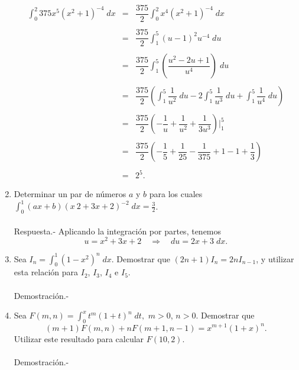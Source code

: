 \begin{enumerate}[\bfseries 1.]
	$$
	\begin{array}{rcl}
	    \displaystyle\int_0^2 375x^5\left(x^2+1\right)^{-4}\; dx &=& \dfrac{375}{2}\displaystyle\int_0^2 x^4\left(x^2+1\right)^{-4}\; dx\\\\
								     &=& \dfrac{375}{2}\displaystyle\int_1^5 (u-1)^2u^{-4}\; du\\\\
								     &=& \dfrac{375}{2}\displaystyle\int_1^5 \left(\dfrac{u^2-2u+1}{u^4}\right)\; du\\\\
								     &=& \dfrac{375}{2} \left(\displaystyle\int_1^5\dfrac{1}{u^2}\; du-2\int_1^5 \dfrac{1}{u^3}\; du + \int_1^5\dfrac{1}{u^4}\; du\right)\\\\
								     &=& \dfrac{375}{2} \left(-\dfrac{1}{u} + \dfrac{1}{u^2} + \dfrac{1}{3u^3}\right)\bigg|_{1}^{5}\\\\
								     &=& \dfrac{375}{2} \left(-\dfrac{1}{5} + \dfrac{1}{25} - \dfrac{1}{375}+1-1+\dfrac{1}{3}\right)\\\\
								     &=& 2^5.
	\end{array}
	$$
	\vspace{.5cm}

    \item Determinar un par de números $a$ y $b$ para los cuales $\displaystyle\int_0^1(ax+b)\left(x~ 2+3x+2\right)^{-2}\; dx=\frac{3}{2}$.\\\\
	Respuesta.-\; Aplicando la integración por partes, tenemos
	$$u=x^2+3x+2\quad \Rightarrow \quad du=2x+3\; dx.$$



    \item Sea $I_n = \int_0^1 \left(1-x^2\right)^n\; dx$. Demostrar que $(2n+1)I_n=2nI_{n-1}$, y utilizar esta relación para $I_2$, $I_3$, $I_4$ e $I_5$.\\\\
	Demostración.-\;

    \item Sea $F(m,n)=\int_0^x t^m(1+t)^n \; dt,$ $m>0$, $n>0$. Demostrar que
    $$(m+1)F(m,n)+nF(m+1,n-1)=x^{m+1}(1+x)^n.$$
    Utilizar este resultado para calcular $F(10,2)$.\\\\
	Demostración.-\;


\end{enumerate}
